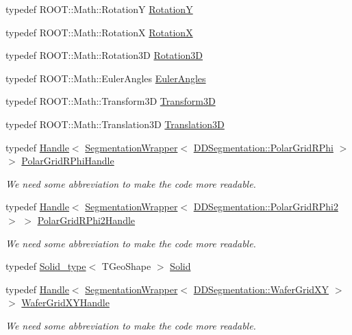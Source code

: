 \begin{DoxyCompactItemize}
\item 
typedef R\+O\+O\+T\+::\+Math\+::\+RotationY \hyperlink{namespace_d_d4hep_1_1_geometry_a452190ab96c581a3e59793c7ae11e3f1}{RotationY}
\item 
typedef R\+O\+O\+T\+::\+Math\+::\+RotationX \hyperlink{namespace_d_d4hep_1_1_geometry_a42f6ad69a030aba78a706e72c7ef220e}{RotationX}
\item 
typedef R\+O\+O\+T\+::\+Math\+::\+Rotation3D \hyperlink{namespace_d_d4hep_1_1_geometry_a022fecb763315fa2bf39cbb648944a0e}{Rotation3D}
\item 
typedef R\+O\+O\+T\+::\+Math\+::\+Euler\+Angles \hyperlink{namespace_d_d4hep_1_1_geometry_a48c636127488441c543a2c7237cba0d1}{Euler\+Angles}
\item 
typedef R\+O\+O\+T\+::\+Math\+::\+Transform3D \hyperlink{namespace_d_d4hep_1_1_geometry_aeb4c0356d12fd7be49a0aae50514e64b}{Transform3D}
\item 
typedef R\+O\+O\+T\+::\+Math\+::\+Translation3D \hyperlink{namespace_d_d4hep_1_1_geometry_ab90afde486c9b46f4fa91bc659271b99}{Translation3D}
\item 
typedef \hyperlink{class_d_d4hep_1_1_handle}{Handle}$<$ \hyperlink{class_d_d4hep_1_1_geometry_1_1_segmentation_wrapper}{Segmentation\+Wrapper}$<$ \hyperlink{class_d_d4hep_1_1_d_d_segmentation_1_1_polar_grid_r_phi}{D\+D\+Segmentation\+::\+Polar\+Grid\+R\+Phi} $>$ $>$ \hyperlink{namespace_d_d4hep_1_1_geometry_a3b5a44856fd99ab92095fea0764485d3}{Polar\+Grid\+R\+Phi\+Handle}
\begin{DoxyCompactList}\small\item\em We need some abbreviation to make the code more readable. \end{DoxyCompactList}\item 
typedef \hyperlink{class_d_d4hep_1_1_handle}{Handle}$<$ \hyperlink{class_d_d4hep_1_1_geometry_1_1_segmentation_wrapper}{Segmentation\+Wrapper}$<$ \hyperlink{class_d_d4hep_1_1_d_d_segmentation_1_1_polar_grid_r_phi2}{D\+D\+Segmentation\+::\+Polar\+Grid\+R\+Phi2} $>$ $>$ \hyperlink{namespace_d_d4hep_1_1_geometry_a0cd92d5c1d6efd314dfa1a555faab017}{Polar\+Grid\+R\+Phi2\+Handle}
\begin{DoxyCompactList}\small\item\em We need some abbreviation to make the code more readable. \end{DoxyCompactList}\item 
typedef \hyperlink{class_d_d4hep_1_1_geometry_1_1_solid__type}{Solid\+\_\+type}$<$ T\+Geo\+Shape $>$ \hyperlink{namespace_d_d4hep_1_1_geometry_a83de90a8dcc7378ba47d54ef9a6a687b}{Solid}
\item 
typedef \hyperlink{class_d_d4hep_1_1_handle}{Handle}$<$ \hyperlink{class_d_d4hep_1_1_geometry_1_1_segmentation_wrapper}{Segmentation\+Wrapper}$<$ \hyperlink{class_d_d4hep_1_1_d_d_segmentation_1_1_wafer_grid_x_y}{D\+D\+Segmentation\+::\+Wafer\+Grid\+XY} $>$ $>$ \hyperlink{namespace_d_d4hep_1_1_geometry_a867af80aa83c181772e515bb22a1de35}{Wafer\+Grid\+X\+Y\+Handle}
\begin{DoxyCompactList}\small\item\em We need some abbreviation to make the code more readable. \end{DoxyCompactList}\end{DoxyCompactItemize}
